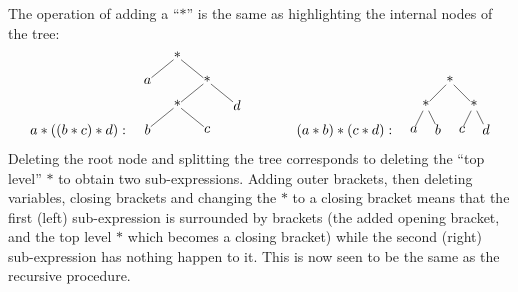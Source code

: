 \documentclass[twoside,a4paper,12pt]{article}
\theoremstyle{plain}
\theoremstyle{definition}
\begin{document}
The operation of adding a ``$*$'' is the same as highlighting the internal nodes of the tree:
\[
a*((b*c)*d): \quad
\begin{tikzpicture}[level distance=4ex, every node/.style={inner sep=0pt}]
  \node {*}
    child {node {$a$}}
    child {node {*}
      child {node {*}
         child {node {$b$}}
         child {node {$c$}}
      }
      child {node {$d$}}
    };
\end{tikzpicture}
\qquad\qquad
(a*b)*(c*d): \quad
\begin{tikzpicture}[level distance=4ex, every node/.style={inner sep=0pt}, level 1/.style={sibling distance=8ex},
   level 2/.style={sibling distance=4ex}]
  \node {*}
    child {node {*}
      child {node {$a$}}
      child {node {$b$}}
    }
    child {node {*}
      child {node {$c$}}
      child {node {$d$}}
    };
\end{tikzpicture}\]
Deleting the root node and splitting the tree corresponds to deleting the ``top level'' $*$ to obtain two sub-expressions.  Adding outer brackets, then deleting variables, closing brackets and changing the $*$ to a closing bracket means that the first (left) sub-expression is surrounded by brackets (the added opening bracket, and the top level $*$ which becomes a closing bracket) while the second (right) sub-expression has nothing happen to it.  This is now seen to be the same as the recursive procedure.
\end{document}
